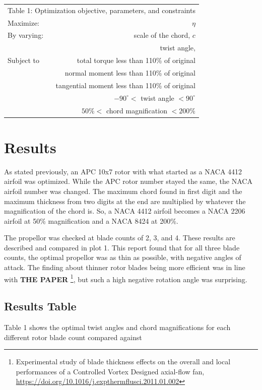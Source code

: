 \documentclass[journal ]{new-aiaa}
\begin{document}
\begin{tabular}{l  r}
	 \multicolumn{2}{c}{Table 1: Optimization objective, parameters, and constraints}  \\
  	Maximize: & $\eta$ \\ \hline
  	By varying: & scale of the chord, $c$ \\ 
  	 & twist angle, \\  \hline
  	Subject to & total torque less than 110\% of original \\ 
	 & normal moment less than 110\% of original \\ 
	 & tangential moment less than 110\% of original \\ 
	 & $-90^{\circ} <$ twist angle $< 90^{\circ}$ \\
	 & $50\% <$ chord magnification $< 200\% $
\end{tabular} \newline



\section{Results}

As stated previously, an APC 10x7 rotor with what started as a NACA 4412 airfoil was optimized. While the APC rotor number stayed the same, the NACA airfoil number was changed. The maximum chord found in first digit and the maximum thickness from two digits at the end are multiplied by whatever the magnification of the chord is. So, a NACA 4412 airfoil becomes a NACA 2206 airfoil at 50\% magnification and a NACA 8424 at 200\%.

The propellor was checked at blade counts of 2, 3, and 4. These results are described and compared in plot 1. This report found that for all three blade counts, the optimal propellor was as thin as possible, with negative angles of attack. The finding about thinner rotor blades being more efficient was in line with \textbf{THE PAPER} \footnote{Experimental study of blade thickness effects on the overall and local performances of a Controlled Vortex Designed axial-flow fan, \url{https://doi.org/10.1016/j.expthermflusci.2011.01.002}}, but such a high negative rotation angle was surprising.

\subsection{Results Table}

Table 1 shows the optimal twist angles and chord magnifications for each different rotor blade count compared against 
\end{document}
